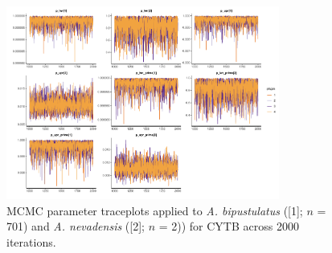 \documentclass[12pt]{article}
\begin{document}
\begin{figure}[H]

\centering

\includegraphics[width=0.80\textwidth]{Figure 2}

\caption{MCMC parameter traceplots applied to \textit{A. bipustulatus} ([1]; $n$ = 701) and \textit{A. nevadensis} ([2]; $n$ = 2)) for CYTB across 2000 iterations.}

\end{figure}
\end{document}
